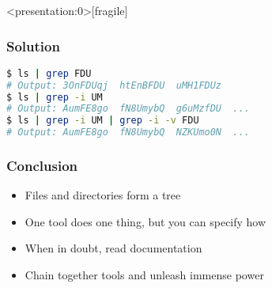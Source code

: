 \begin{frame}<presentation:0>[fragile]
\frametitle{Solution}
\begin{lstlisting}[language=bash]
$ ls | grep FDU
# Output: 3OnFDUqj  htEnBFDU  uMH1FDUz
$ ls | grep -i UM
# Output: AumFE8go  fN8UmybQ  g6uMzfDU  ...
$ ls | grep -i UM | grep -i -v FDU
# Output: AumFE8go  fN8UmybQ  NZKUmo0N  ...
\end{lstlisting}
\end{frame}

\begin{frame}
\frametitle{Conclusion}
\begin{itemize}
    \item Files and directories form a tree
    \item One tool does one thing, but you can specify how
    \item When in doubt, read documentation
    \item Chain together tools and unleash immense power
\end{itemize}
\end{frame}
